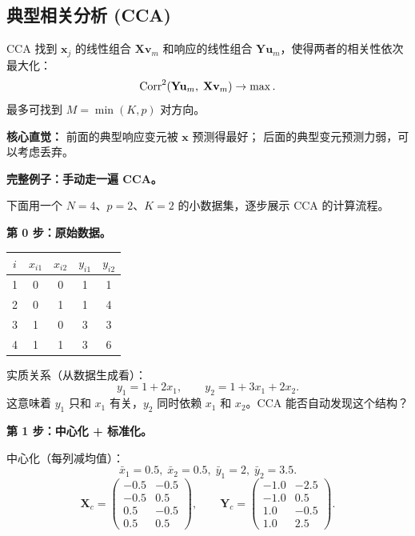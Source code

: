 \subsection{典型相关分析 (CCA)}

CCA 找到 $\mathbf{x}_j$ 的线性组合 $\mathbf{X}\mathbf{v}_m$ 和响应的线性组合
$\mathbf{Y}\mathbf{u}_m$，使得两者的相关性依次最大化：
\[
    \mathrm{Corr}^2(\mathbf{Y}\mathbf{u}_m,\; \mathbf{X}\mathbf{v}_m) \to \max.
\]
最多可找到 $M = \min(K, p)$ 对方向。

\textbf{核心直觉：} 前面的典型响应变元被 $\mathbf{x}$ 预测得最好；
后面的典型变元预测力弱，可以考虑丢弃。

\medskip
\noindent
\textbf{完整例子：手动走一遍 CCA。}

下面用一个 $N=4$、$p=2$、$K=2$ 的小数据集，逐步展示 CCA 的计算流程。

\medskip
\noindent
\textbf{第 0 步：原始数据。}

\begin{center}
\renewcommand{\arraystretch}{1.3}
\begin{tabular}{c|cc|cc}
\toprule
$i$ & $x_{i1}$ & $x_{i2}$ & $y_{i1}$ & $y_{i2}$ \\
\midrule
1 & 0 & 0 & 1 & 1 \\
2 & 0 & 1 & 1 & 4 \\
3 & 1 & 0 & 3 & 3 \\
4 & 1 & 1 & 3 & 6 \\
\bottomrule
\end{tabular}
\end{center}

实质关系（从数据生成看）：
\[
    y_1 = 1 + 2x_1, \qquad y_2 = 1 + 3x_1 + 2x_2.
\]
这意味着 $y_1$ 只和 $x_1$ 有关，$y_2$ 同时依赖 $x_1$ 和 $x_2$。CCA 能否自动发现这个结构？

\medskip
\noindent
\textbf{第 1 步：中心化 + 标准化。}

中心化（每列减均值）：
\[
    \bar{x}_1 = 0.5,\; \bar{x}_2 = 0.5,\; \bar{y}_1 = 2,\; \bar{y}_2 = 3.5.
\]
\[
    \mathbf{X}_c = \begin{pmatrix}
        -0.5 & -0.5 \\
        -0.5 &  0.5 \\
         0.5 & -0.5 \\
         0.5 &  0.5
    \end{pmatrix},\qquad
    \mathbf{Y}_c = \begin{pmatrix}
        -1.0 & -2.5 \\
        -1.0 &  0.5 \\
         1.0 & -0.5 \\
         1.0 &  2.5
    \end{pmatrix}.
\]

